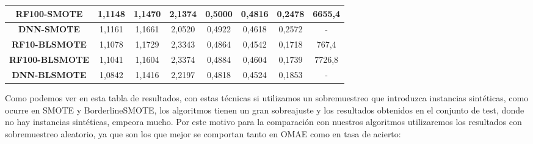 \begin{table}[H]
{\begin{tabular}{|cccccccc|}
\multicolumn{1}{|c|}{\textbf{RF100-SMOTE}}       & \multicolumn{1}{c|}{1,1148}           & \multicolumn{1}{c|}{1,1470}             & \multicolumn{1}{c|}{2,1374}          & \multicolumn{1}{c|}{0,5000}           & \multicolumn{1}{c|}{0,4816}             & \multicolumn{1}{c|}{0,2478}          & 6655,4                              \\ \hline
\multicolumn{1}{|c|}{\textbf{DNN-SMOTE}}         & \multicolumn{1}{c|}{1,1161}           & \multicolumn{1}{c|}{1,1661}             & \multicolumn{1}{c|}{2,0520}          & \multicolumn{1}{c|}{0,4922}           & \multicolumn{1}{c|}{0,4618}             & \multicolumn{1}{c|}{0,2572}          & -                                   \\ \hline
\multicolumn{1}{|c|}{\textbf{RF10-BLSMOTE}}      & \multicolumn{1}{c|}{1,1078}           & \multicolumn{1}{c|}{1,1729}             & \multicolumn{1}{c|}{2,3343}          & \multicolumn{1}{c|}{0,4864}           & \multicolumn{1}{c|}{0,4542}             & \multicolumn{1}{c|}{0,1718}          & 767,4                               \\ \hline
\multicolumn{1}{|c|}{\textbf{RF100-BLSMOTE}}     & \multicolumn{1}{c|}{1,1041}            & \multicolumn{1}{c|}{1,1604}              & \multicolumn{1}{c|}{2,3374}          & \multicolumn{1}{c|}{0,4884}           & \multicolumn{1}{c|}{0,4604}              & \multicolumn{1}{c|}{0,1739}          & 7726,8                              \\ \hline
\multicolumn{1}{|c|}{\textbf{DNN-BLSMOTE}}       & \multicolumn{1}{c|}{1,0842}            & \multicolumn{1}{c|}{1,1416}             & \multicolumn{1}{c|}{2,2197}          & \multicolumn{1}{c|}{0,4818}            & \multicolumn{1}{c|}{0,4524}             & \multicolumn{1}{c|}{0,1853}          & -                                   \\ \hline
\end{tabular}%
}
\end{table}

Como podemos ver en esta tabla de resultados, con estas técnicas si utilizamos un sobremuestreo que introduzca instancias sintéticas, como ocurre en SMOTE y BorderlineSMOTE, los algoritmos tienen un gran sobreajuste y los resultados obtenidos en el conjunto de test, donde no hay instancias sintéticas, empeora mucho. Por este motivo para la comparación con nuestros algoritmos utilizaremos los resultados con sobremuestreo aleatorio, ya que son los que mejor se comportan tanto en OMAE como en tasa de acierto:


